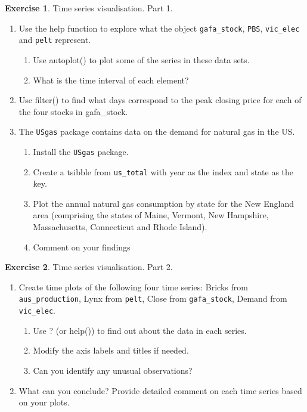 \documentclass[a4,a4paper,10pt,notitlepage,english]{article}
\theoremstyle{definition}
\newtheorem{exo}{Exercise}
\begin{document}
	\smallskip
	\begin{exo} 
		Time series visualisation. Part 1.
		\begin{enumerate}
			\item Use the help function to explore what the object \texttt{gafa\_stock}, \texttt{PBS}, \texttt{vic\_elec} and \texttt{pelt} represent.
			
			\begin{enumerate}
				\item Use autoplot() to plot some of the series in these data sets.
				\item What is the time interval of each element?
			\end{enumerate}
			\item Use filter() to find what days correspond to the peak closing price for each of the four stocks in gafa\_stock.
			\item The \texttt{USgas} package contains data on the demand for natural gas in the US.
			
			\begin{enumerate}
				\item Install the \texttt{USgas} package.
				\item Create a tsibble from \texttt{us\_total} with year as the index and state as the key.
				\item Plot the annual natural gas consumption by state for the New England area (comprising the states of Maine, Vermont, New Hampshire, Massachusetts, Connecticut and Rhode Island).
				\item Comment on your findings
			\end{enumerate}
			
		\end{enumerate}
	\end{exo}
	\bigskip
	
	
	\begin{exo} 
		Time series visualisation. Part 2.
		\begin{enumerate}
			\item Create time plots of the following four time series: Bricks from \texttt{aus\_production}, Lynx from \texttt{pelt}, Close from \texttt{gafa\_stock}, Demand from \texttt{vic\_elec}.
			\begin{enumerate}
				\item Use ? (or help()) to find out about the data in each series.
				\item Modify the axis labels and titles if needed.
				\item Can you identify any unusual observations?
			\end{enumerate}
			\item What can you conclude? Provide detailed comment on each time series based on your plots.
		\end{enumerate}
		
		
	\end{exo}
	
\end{document}
